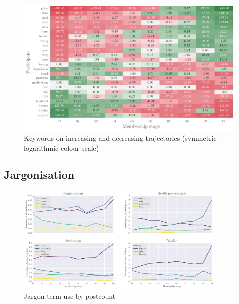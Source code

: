 \begin{figure}[htb]
    \centering
    \small
    \includegraphics[width=1\textwidth]{../images/symlog-part2}
    \caption[Keywords on increasing and decreasing trajectories]{Keywords on increasing and decreasing trajectories (symmetric logarithmic colour scale)}
    \label{fig:key-traj}
    \end{figure}



\subsection{Jargonisation} \label{sect:jargon}

\begin{figure}[htb]
    \begin{center}
    \includegraphics[width=0.90\textwidth]{../images/better_jargon.png}
    \end{center}
    \caption{Jargon term use by postcount}
    \label{fig:jargon}
    \end{figure}

